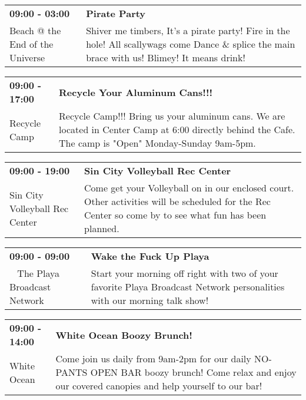 \begin{tabular}{ p{1in} p{2.2in} }
    \textbf{09:00 - 03:00} & \textbf{Pirate Party} \\
    Beach @ the End of the Universe \newline  & Shiver me timbers, It's a pirate party! Fire in the hole! All scallywags come Dance \& splice the main brace with us! Blimey! It means drink! \\
    \hline 
\end{tabular}
    
\begin{tabular}{ p{1in} p{2.2in} }
    \textbf{09:00 - 17:00} & \textbf{Recycle Your Aluminum Cans!!!} \\
    Recycle Camp \newline  & Recycle Camp!!! Bring us your aluminum cans. We are located in Center Camp at 6:00 directly behind the Cafe. The camp is "Open" Monday-Sunday 9am-5pm. \\
    \hline 
\end{tabular}
    
\begin{tabular}{ p{1in} p{2.2in} }
    \textbf{09:00 - 19:00} & \textbf{Sin City Volleyball Rec Center} \\
    Sin City Volleyball Rec Center \newline  & Come get your Volleyball on in our enclosed court. Other activities will be scheduled for the Rec Center so come by to see what fun has been planned. \\
    \hline 
\end{tabular}
    
\begin{tabular}{ p{1in} p{2.2in} }
    \textbf{09:00 - 09:00} & \textbf{Wake the Fuck Up Playa} \\
    ~ \newline The Playa Broadcast Network & Start your morning off right with two of your favorite Playa Broadcast Network personalities with our morning talk show! \\
    \hline 
\end{tabular}
    
\begin{tabular}{ p{1in} p{2.2in} }
    \textbf{09:00 - 14:00} & \textbf{White Ocean Boozy Brunch!} \\
    White Ocean \newline  & Come join us daily from 9am-2pm for our daily NO-PANTS OPEN BAR boozy brunch! Come relax and enjoy our covered canopies and help yourself to our bar! \\
    \hline 
\end{tabular}
    
